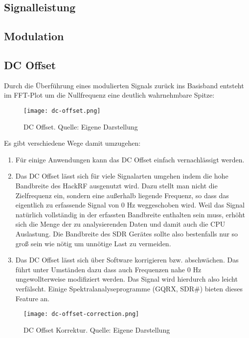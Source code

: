 \subsection{Signalleistung}
\subsection{Modulation}
\subsection{DC Offset}
Durch die Überführung eines modulierten Signals zurück ins Basisband entsteht im FFT-Plot um die Nullfrequenz eine deutlich wahrnehmbare Spitze:
\begin{figure}[ht]
	\centering
	\texttt{[image: dc-offset.png]}
	\caption[DC Offset]{DC Offset. Quelle: Eigene Darstellung} 
	\label{dc-offset}
\end{figure}

Es gibt verschiedene Wege damit umzugehen:
\begin{enumerate}
	\item Für einige Anwendungen kann das DC Offset einfach vernachlässigt werden.
	\item Das DC Offset lässt sich für viele Signalarten umgehen indem die hohe Bandbreite des HackRF ausgenutzt wird. 
	Dazu stellt man nicht die Zielfrequenz ein, sondern eine außerhalb liegende Frequenz, so dass das eigentlich zu erfassende Signal von 0 Hz  weggeschoben wird. Weil das Signal natürlich vollständig in der erfassten Bandbreite enthalten sein muss, erhöht sich die Menge der zu analysierenden Daten und damit auch die CPU Auslastung. Die Bandbreite des SDR Gerätes sollte also bestenfalls nur so groß sein wie nötig um unnötige Last zu vermeiden.
	\item Das DC Offset lässt sich über Software korrigieren bzw. abschwächen. Das führt unter Umständen dazu dass auch Frequenzen nahe 0 Hz ungewollterweise modifiziert werden. Das Signal wird hierdurch also leicht verfälscht. Einige Spektralanalyseprogramme (GQRX, SDR\#) bieten dieses Feature an.
\end{enumerate}

\begin{figure}[ht]
	\centering
	\texttt{[image: dc-offset-correction.png]}
	\caption[DC Offset Korrektur]{DC Offset Korrektur. Quelle: Eigene Darstellung} 
	\label{dc-offset-correction}
\end{figure}



